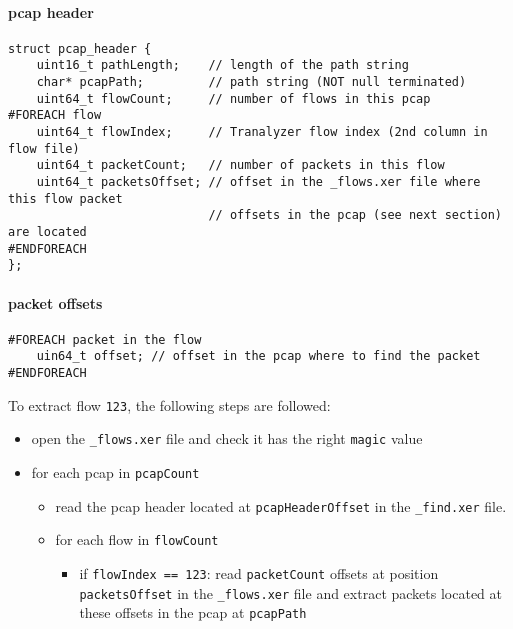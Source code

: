 \documentclass[documentation]{subfiles}
\begin{document}
\paragraph{pcap header}
\begin{verbatim}
struct pcap_header {
    uint16_t pathLength;    // length of the path string
    char* pcapPath;         // path string (NOT null terminated)
    uint64_t flowCount;     // number of flows in this pcap
#FOREACH flow
    uint64_t flowIndex;     // Tranalyzer flow index (2nd column in flow file)
    uint64_t packetCount;   // number of packets in this flow
    uint64_t packetsOffset; // offset in the _flows.xer file where this flow packet
                            // offsets in the pcap (see next section) are located
#ENDFOREACH
};
\end{verbatim}

\paragraph{packet offsets}
\begin{verbatim}
#FOREACH packet in the flow
    uin64_t offset; // offset in the pcap where to find the packet
#ENDFOREACH
\end{verbatim}

To extract flow {\tt 123}, the following steps are followed:
\begin{itemize}
    \item open the {\tt \_flows.xer} file and check it has the right {\tt magic} value
    \item for each pcap in {\tt pcapCount}
    \begin{itemize}
        \item read the pcap header located at {\tt pcapHeaderOffset} in the {\tt \_find.xer} file.
        \item for each flow in {\tt flowCount}
        \begin{itemize}
            \item if {\tt flowIndex == 123}: read {\tt packetCount} offsets at position {\tt packetsOffset} in the {\tt \_flows.xer} file
            and extract packets located at these offsets in the pcap at {\tt pcapPath}
        \end{itemize}
    \end{itemize}
\end{itemize}
\end{document}
